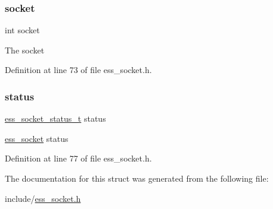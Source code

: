 \subsubsection{\texorpdfstring{socket}{socket}}
{\footnotesize\ttfamily int socket}

The socket 

Definition at line 73 of file ess\+\_\+socket.\+h.

\mbox{\label{structess__socket_a4e47521e8af756b9edf77f1f02f9b725}} 
\subsubsection{\texorpdfstring{status}{status}}
{\footnotesize\ttfamily \hyperlink{ess__socket_8h_ae3a6dc482fc34f9ea0361820ba4be573}{ess\+\_\+socket\+\_\+status\+\_\+t} status}

\hyperlink{structess__socket}{ess\+\_\+socket} status 

Definition at line 77 of file ess\+\_\+socket.\+h.



The documentation for this struct was generated from the following file\+:\begin{DoxyCompactItemize}
\item 
include/\hyperlink{ess__socket_8h}{ess\+\_\+socket.\+h}\end{DoxyCompactItemize}
